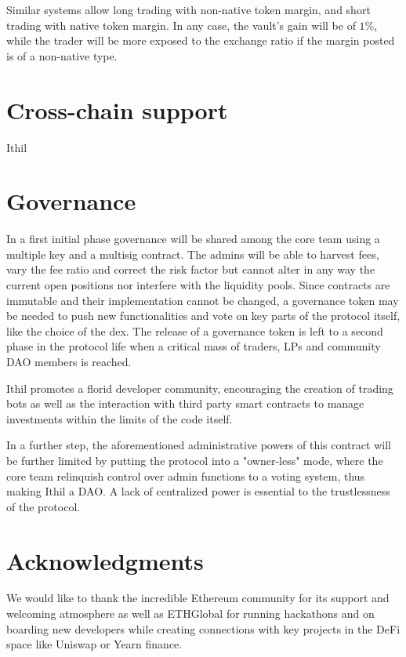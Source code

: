 \documentclass[a4paper,10 pt]{article}
\theoremstyle{definition}
\begin{document}
Similar systems allow long trading with non-native token margin, and short trading with native token margin. In any case, the vault's gain will be of $1$\%, while the trader will be more exposed to the exchange ratio if the margin posted is of a non-native type.

\section{Cross-chain support}
Ithil 

\section{Governance}
In a first initial phase governance will be shared among the core team using a multiple key and a multisig contract. The admins will be able to harvest fees, vary the fee ratio and correct the risk factor but cannot alter in any way the current open positions nor interfere with the liquidity pools.
Since contracts are immutable and their implementation cannot be changed, a governance token may be needed to push new functionalities and vote on key parts of the protocol itself, like the choice of the dex. The release of a governance token is left to a second phase in the protocol life when a critical mass of traders, LPs and community DAO members is reached.

Ithil promotes a florid developer community, encouraging the creation of trading bots as well as the interaction with third party smart contracts to manage investments within the limits of the code itself.

In a further step, the aforementioned administrative powers of this contract will be further limited by putting the protocol into a "owner-less" mode, where the core team relinquish control over admin functions to a voting system, thus making Ithil a DAO. A lack of centralized power is essential to the trustlessness of the protocol.

\section{Acknowledgments}

We would like to thank the incredible Ethereum community for its support and welcoming atmosphere as well as ETHGlobal for running hackathons and on boarding new developers while creating connections with key projects in the DeFi space like Uniswap or Yearn finance.
\end{document}

